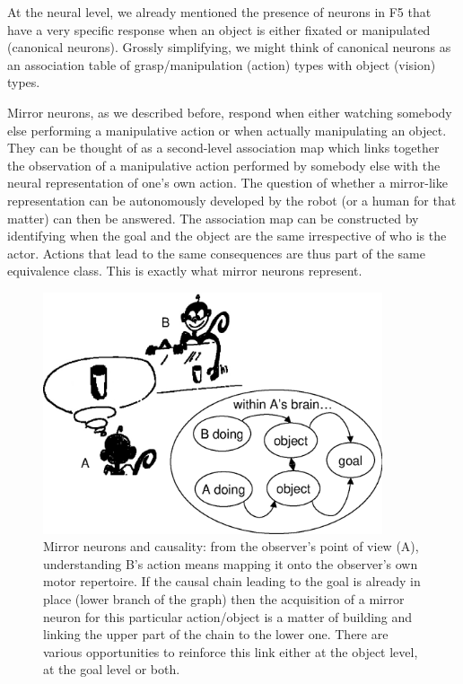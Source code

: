 \ifverbose
At the neural level, we already mentioned the presence of neurons in
F5 that have a very specific response when an object is either fixated
or manipulated (canonical neurons). Grossly simplifying, we might
think of canonical neurons as an association table of
grasp/manipulation (action) types with object (vision) types.
\fi

Mirror neurons, as we described before, respond when either watching 
somebody else performing a manipulative action or when actually 
manipulating an object. They can be thought of as a second-level 
association map which links together the observation of a manipulative 
action performed by somebody else with the neural representation of one's 
own action. The question of whether a mirror-like representation can be
autonomously developed by the robot (or a human for that matter) can
then be answered. The association map can be constructed by
identifying when the goal and the object are the same irrespective of
who is the actor. Actions that lead to the same consequences are thus
part of the same equivalence class.  This is exactly what mirror neurons
represent.

\begin{figure}[tb]
\begin{center}
\includegraphics[width=10cm]{mirror-monkey.eps}
\caption{ 
\label{fig:mirror-monkey}
%
Mirror neurons and causality: from the observer's point
of view (A), understanding B's action means mapping it onto the
observer's own
motor repertoire. If the causal chain leading to the goal is already
in place (lower branch of the graph) then the acquisition of a
mirror neuron for this particular action/object is a matter of
building and linking the upper part of the chain to the lower one.
There are various opportunities to reinforce this link either at the object
level, at the goal level or both. 
%
}
\end{center}
\end{figure}


